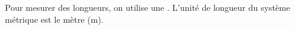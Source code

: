Pour mesurer des longueurs, on utilise une .
L'unité de longueur du système métrique est le mètre (m).